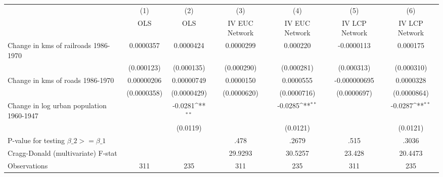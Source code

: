 {
\def\sym#1{\ifmmode^{#1}\else\(^{#1}\)\fi}
\begin{tabular}{l*{6}{c}}
\hline\hline
                &\multicolumn{1}{c}{(1)}&\multicolumn{1}{c}{(2)}&\multicolumn{1}{c}{(3)}&\multicolumn{1}{c}{(4)}&\multicolumn{1}{c}{(5)}&\multicolumn{1}{c}{(6)}\\
                &\multicolumn{1}{c}{OLS}&\multicolumn{1}{c}{OLS}&\multicolumn{1}{c}{IV EUC Network}&\multicolumn{1}{c}{IV EUC Network}&\multicolumn{1}{c}{IV LCP Network}&\multicolumn{1}{c}{IV LCP Network}\\
\hline
Change in kms of railroads 1986-1970&0.0000357         &0.0000424         &0.0000299         & 0.000220         &-0.0000113         & 0.000175         \\
                &(0.000123)         &(0.000135)         &(0.000290)         &(0.000281)         &(0.000313)         &(0.000310)         \\
[1em]
Change in kms of roads 1986-1970&0.00000206         &0.00000749         &0.0000150         &0.0000555         &-0.000000695         &0.0000328         \\
                &(0.0000358)         &(0.0000429)         &(0.0000620)         &(0.0000716)         &(0.0000697)         &(0.0000864)         \\
[1em]
Change in log urban population 1960-1947&                  &  -0.0281\sym{**} &                  &  -0.0285\sym{**} &                  &  -0.0287\sym{**} \\
                &                  & (0.0119)         &                  & (0.0121)         &                  & (0.0121)         \\
\hline
P-value for testing $\beta\_{2} >= \beta\_{1}$&                  &                  &     .478         &    .2679         &     .515         &    .3036         \\
Cragg-Donald (multivariate) F-stat&                  &                  &  29.9293         &  30.5257         &   23.428         &  20.4473         \\
Observations    &      311         &      235         &      311         &      235         &      311         &      235         \\
\hline\hline
\end{tabular}
}
